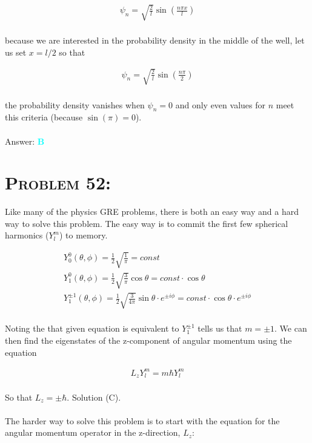 \documentclass{article}
\begin{document}
\begin{gather}
\psi_{n} = \sqrt{\frac{2}{l}} \sin{\left(  \frac{n \pi x}{l}  \right)}
\end{gather}
\\
because we are interested in the probability density in the middle of the well, let us set $x= l/2$ so that 

\begin{gather}
\psi_{n} = \sqrt{\frac{2}{l}} \sin{\left(  \frac{n \pi}{2}  \right)}\nonumber
\end{gather}
\\
the probability density vanishes when $\psi_{n} = 0$ and only even values for $n$  meet this criteria (because $\sin{(\pi)} = 0$).
\\\\
Answer: \textbf{\textcolor{cyan}B}\\


\section{\textsc{Problem 52:}} Like many of the physics GRE problems, there is both an easy way and a hard way to solve this problem. The easy way is to commit the first few spherical harmonics ($Y^{m}_{l}$) to memory.

\begin{gather}
Y^{0}_{0} (\theta , \phi) = \frac{1}{2} \sqrt{\frac{1}{\pi}} = const\\
Y^{0}_{1} (\theta , \phi) = \frac{1}{2} \sqrt{\frac{3}{\pi}} \cos{\theta} = const \cdot \cos{\theta}\\
Y^{\pm 1}_{1} (\theta , \phi) = \frac{1}{2} \sqrt{\frac{3}{4\pi}} \sin{\theta} \cdot e^{\pm i \phi} = const \cdot \cos{\theta}\cdot e^{\pm i \phi} 
\end{gather}
\\
Noting the that given equation is equivalent to $Y^{\pm 1}_{1}$ tells us that $m = \pm 1$. We can then find the eigenstates of the z-component of angular momentum using the equation

\begin{gather}
\label {eq: Lz} L_{z} Y^{m}_{l} = m\hbar Y^{m}_{l}
\end{gather} 
\\
So that $L_{z} = \pm \hbar$. Solution (C).\\
\\
The harder way to solve this problem is to start with the equation for the angular momentum operator in the z-direction, $L_{z}$:
\end{document}
